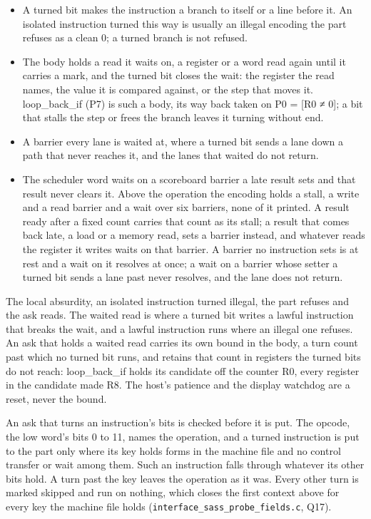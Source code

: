 \begin{itemize}
\item A turned bit makes the instruction a branch to itself or a line before it. An isolated instruction turned this way is usually an illegal encoding the part refuses as a clean 0; a turned branch is not refused.
\item The body holds a read it waits on, a register or a word read again until it carries a mark, and the turned bit closes the wait: the register the read names, the value it is compared against, or the step that moves it. loop\_\allowbreak{}back\_\allowbreak{}if (P7) is such a body, its way back taken on P0 = [R0 ≠ 0]; a bit that stalls the step or frees the branch leaves it turning without end.
\item A barrier every lane is waited at, where a turned bit sends a lane down a path that never reaches it, and the lanes that waited do not return.
\item The scheduler word waits on a scoreboard barrier a late result sets and that result never clears it. Above the operation the encoding holds a stall, a write and a read barrier and a wait over six barriers, none of it printed. A result ready after a fixed count carries that count as its stall; a result that comes back late, a load or a memory read, sets a barrier instead, and whatever reads the register it writes waits on that barrier. A barrier no instruction sets is at rest and a wait on it resolves at once; a wait on a barrier whose setter a turned bit sends a lane past never resolves, and the lane does not return.
\end{itemize}

The local absurdity, an isolated instruction turned illegal, the part refuses and the ask reads. The waited read is where a turned bit writes a lawful instruction that breaks the wait, and a lawful instruction runs where an illegal one refuses. An ask that holds a waited read carries its own bound in the body, a turn count past which no turned bit runs, and retains that count in registers the turned bits do not reach: loop\_\allowbreak{}back\_\allowbreak{}if holds its candidate off the counter R0, every register in the candidate made R8. The host's patience and the display watchdog are a reset, never the bound.

An ask that turns an instruction's bits is checked before it is put. The opcode, the low word's bits 0 to 11, names the operation, and a turned instruction is put to the part only where its key holds forms in the machine file and no control transfer or wait among them. Such an instruction falls through whatever its other bits hold. A turn past the key leaves the operation as it was. Every other turn is marked skipped and run on nothing, which closes the first context above for every key the machine file holds (\texttt{interface\_\allowbreak{}sass\_\allowbreak{}probe\_\allowbreak{}fields.\allowbreak{}c}, Q17).

